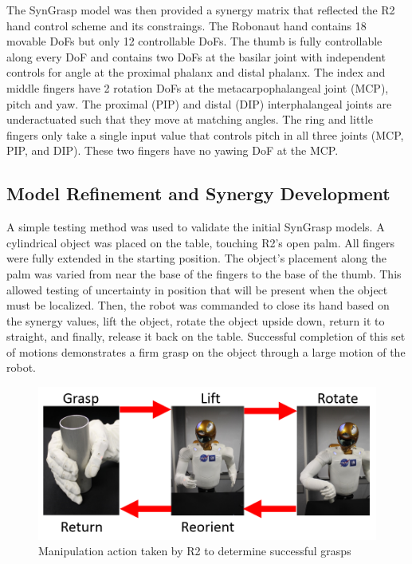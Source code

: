 \documentclass[runningheads,a4paper]{llncs}
\begin{document}
The SynGrasp model was then provided a synergy matrix that reflected the R2 hand control scheme and its constraings.  The Robonaut hand contains 18 movable DoFs but only 12 controllable DoFs.  The thumb is fully controllable along every DoF and contains two DoFs at the basilar joint with independent controls for angle at the proximal phalanx and distal phalanx.  The index and middle fingers have 2 rotation DoFs at the metacarpophalangeal joint (MCP), pitch and yaw.  The proximal (PIP) and distal (DIP) interphalangeal joints are underactuated such that they move at matching angles.  The ring and little fingers only take a single input value that controls pitch in all three joints (MCP, PIP, and DIP).  These two fingers have no yawing DoF at the MCP.


\subsection{Model Refinement and Synergy Development} 
A simple testing method was used to validate the initial SynGrasp models. A cylindrical object was placed on the table, touching R2's open palm. All fingers were fully extended in the starting position.  The object's placement along the palm was varied from near the base of the fingers to the base of the thumb. This allowed testing of uncertainty in position that will be present when the object must be localized. Then, the robot was commanded to close its hand based on the synergy values, lift the object, rotate the object upside down, return it to straight, and finally, release it back on the table. Successful completion of this set of motions demonstrates a firm grasp on the object through a large motion of the robot. 

\begin{figure}[]
  \centering
  \includegraphics[width=\linewidth]{manipulation}
  \caption{Manipulation action taken by R2 to determine successful grasps}
  \label{testing}
\end{figure}
\end{document}

